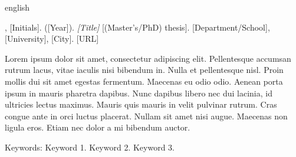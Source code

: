 \begin{resumo}[Abstract]
\begin{otherlanguage*}{english}

\begin{flushleft}
[Surname], [Initials]. ([Year]). \textit{[Title]} [(Master's/PhD) thesis]. [Department/School], [University], [City]. [URL]
\end{flushleft}

Lorem ipsum dolor sit amet, consectetur adipiscing elit. Pellentesque accumsan rutrum lacus, vitae iaculis nisi bibendum in. Nulla et pellentesque nisl. Proin mollis dui sit amet egestas fermentum. Maecenas eu odio odio. Aenean porta ipsum in mauris pharetra dapibus. Nunc dapibus libero nec dui lacinia, id ultricies lectus maximus. Mauris quis mauris in velit pulvinar rutrum. Cras congue ante in orci luctus placerat. Nullam sit amet nisi augue. Maecenas non ligula eros. Etiam nec dolor a mi bibendum auctor.

Keywords: Keyword 1. Keyword 2. Keyword 3.
\end{otherlanguage*}
\end{resumo}


\listoffigures*
\cleardoublepage

%


\listoftables*
\cleardoublepage



